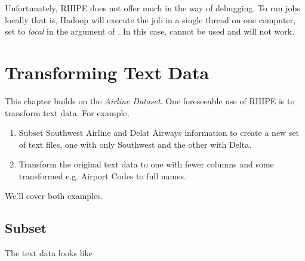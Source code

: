 \documentclass[letterpaper,10pt,english]{sphinxmanual}
\begin{document}
Unfortunately, RHIPE does not offer much in the way of debugging. To run jobs
locally that is, Hadoop will execute the job in a single thread on one computer,
set  to \emph{local} in the  argument of . In
this case,  cannot be used and  will not work.
\label{texttransfirm:rhipeserialize}

\chapter{Transforming Text Data}
\label{texttransfirm::doc}\label{texttransfirm:index-2}\label{texttransfirm:transforming-text-data}
This chapter builds on the \emph{Airline Dataset}. One foreseeable use of RHIPE is
to transform text data. For example,
\begin{enumerate}
\item {} 
Subset Southwest Airline and Delat Airways information to create a new set of text files, one with only Southwest and the other with Delta.

\item {} 
Transform the original text data to one with fewer columns and some transformed e.g. Airport Codes to full names.

\end{enumerate}

We'll cover both examples.


\section{Subset}
\label{texttransfirm:subset}\label{texttransfirm:index-3}
The text data looks like
\end{document}
